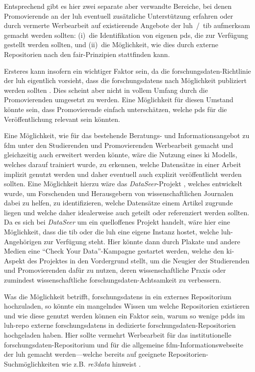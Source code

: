 Entsprechend gibt es hier zwei separate aber verwandte Bereiche, bei denen Promovierende an der \gls{luh} eventuell zusätzliche Unterstützung erfahren oder durch vermerte Werbearbeit auf existierende Angebote der \gls{luh}~/~\gls{tib} aufmerksam gemacht werden sollten:
(i)~die Identifikation von eigenen \glspl{pd}, die zur Verfügung gestellt werden sollten, und (ii)~die Möglichkeit, wie dies durch externe Repositorien nach den \gls{fair}-Prinzipien stattfinden kann.

Ersteres kann insofern ein wichtiger Faktor sein, da die \gls{forschungsdaten}-Richtlinie der \gls{luh} eigentlich vorsieht, dass die \glspl{forschungsdaten} nach Möglichkeit publiziert werden sollten \autocite{luhfdm-richtlinie}.
Dies scheint aber nicht in vollem Umfang durch die Promovierenden umgesetzt zu werden.
Eine Möglichkeit für diesen Umstand könnte sein, dass Promovierende einfach unterschätzen, welche \glspl{pd} für die Veröffentlichung relevant sein könnten.

Eine Möglichkeit, wie für das bestehende Beratungs- und Informationsangebot zu \gls{fdm} unter den Studierenden und Promovierenden Werbearbeit gemacht und gleichzeitig auch erweitert werden könnte, wäre die Nutzung eines \gls{ki} Modells, welches darauf trainiert wurde, zu erkennen, welche Datensätze in einer Arbeit implizit genutzt werden und daher eventuell auch explizit veröffentlicht werden sollten.
Eine Möglichkeit hierzu wäre das \textit{DataSeer}-Projekt \autocite{dataseer}, welches entwickelt wurde, um Forschenden und Herausgebern von wissenschaftlichen Journalen dabei zu helfen, zu identifizieren, welche Datensätze einem Artikel zugrunde liegen und welche daher idealerweise auch geteilt oder referenziert werden sollten.
Da es sich bei \textit{DataSeer} um ein quelloffenes Projekt handelt, wäre hier eine Möglichkeit, dass die \gls{tib} oder die \gls{luh} eine eigene Instanz hostet, welche \gls{luh}-Angehörigen zur Verfügung steht.
Hier könnte dann durch Plakate und andere Medien eine \enquote{Check Your Data}-Kampagne gestartet werden, welche den \gls{ki}-Aspekt des Projektes in den Vordergrund stellt, um die Neugier der Studierenden und Promovierenden dafür zu nutzen, deren wissenschaftliche Praxis oder zumindest wissenschaftliche \gls{forschungsdaten}-Achtsamkeit zu verbessern.

Was die Möglichkeit betrifft, \glspl{forschungsdaten} in ein externes Repositorium hochzuladen, so könnte ein mangelndes Wissen um welche Repositorien existieren und wie diese genutzt werden können ein Faktor sein, warum so wenige \glspl{pdd} im \gls{luh-repo} externe \glspl{forschungsdaten} in dedizierte \gls{forschungsdaten}-Repositorien hochgeladen haben.
Hier sollte vermehrt Werbearbeit für das institutionelle \gls{forschungsdaten}-Repositorium und für die allgemeine \gls{fdm}-Informationswebseite der \gls{luh} gemacht werden---welche bereits auf geeignete Repositorien-Suchmöglichkeiten wie z.B. \textit{re3data} hinweist \autocite{luhfdm-extern}.

